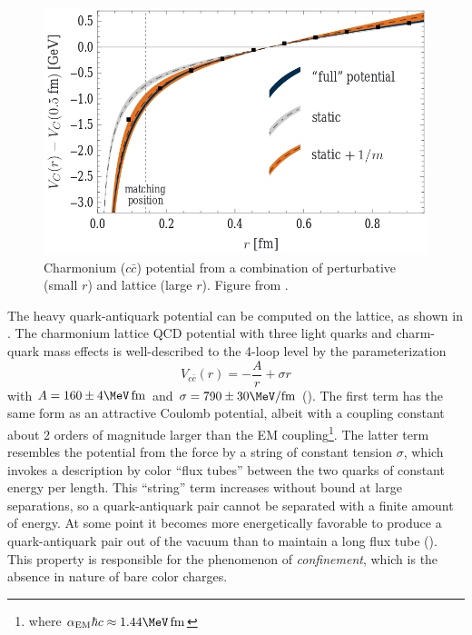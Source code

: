 \begin{figure}[t]
  \includegraphics{ccbar_potential.png}
  \caption{Charmonium ($c\bar{c}$) potential from a combination of perturbative \qcd (small $r$) and lattice \qcd (large $r$). Figure from .}
  \label{fig:charmonium_potential}
\end{figure}

The heavy quark-antiquark potential can be computed on the lattice, as shown in .
The charmonium lattice QCD potential with three light quarks and charm-quark mass effects is well-described to the 4-loop level by the parameterization \cite{Laschka:2011zr}
\begin{equation}
V_{c\bar{c}}(r) = - \frac{A}{r} + \sigma r
\end{equation}
with $A = 160 \pm 4 \MeV\,\fm$ and $\sigma = 790 \pm 30 \MeV/\fm$ ().
The first term has the same form as an attractive Coulomb potential, albeit with a coupling constant about 2 orders of magnitude larger than the \ac{EM} coupling\footnote{where $\alpha_\textrm{EM} \hbar c \approx 1.44 \MeV\,\fm$}.
The latter term resembles the potential from the force by a string of constant tension $\sigma$, which invokes a description by color ``flux tubes'' between the two quarks of constant energy per length.
This ``string'' term increases without bound at large separations, so a quark-antiquark pair cannot be separated with a finite amount of energy.
At some point it becomes more energetically favorable to produce a quark-antiquark pair out of the vacuum than to maintain a long flux tube ().
This property is responsible for the phenomenon of \emph{confinement}, which is the absence in nature of bare color charges.

